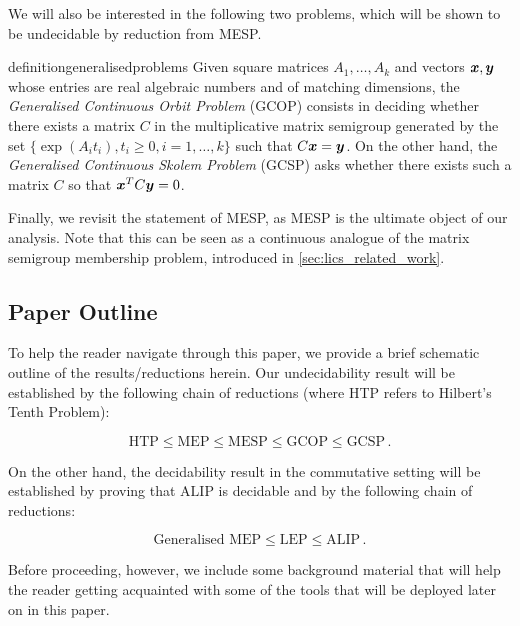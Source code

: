 We will also be interested in the following two problems, which will be shown to be undecidable by reduction from MESP\@.

\begin{restatable}{definition}{generalisedproblems}
\label{def:generalised-problems}
Given square matrices $A_{1}, \ldots, A_{k}$ and vectors $\boldsymbol{x}, \boldsymbol{y}$ whose entries are real algebraic numbers and of matching dimensions, the \emph{Generalised Continuous Orbit Problem} (GCOP) consists in deciding whether there exists a matrix $C$ in the multiplicative matrix semigroup generated by the set $\lbrace \exp(A_{i} t_{i}), t_{i} \geq 0, i = 1, \ldots, k \rbrace$ such that $C\boldsymbol{x} = \boldsymbol{y}$. On the other hand, the \emph{Generalised Continuous Skolem Problem} (GCSP) asks whether there exists such a matrix $C$ so that $\boldsymbol{x}^{T} C \boldsymbol{y} = 0$.
\end{restatable}

Finally, we revisit the statement of MESP, as MESP is the ultimate object of our analysis.
Note that this can be seen as a continuous analogue of the matrix semigroup membership problem, introduced in \cref{sec:lics_related_work}.

\MESP*

\subsection{Paper Outline}
\label{sec:lics_outline}

To help the reader navigate through this paper, we provide a brief schematic outline of the results/reductions herein. Our undecidability result will be established by the following chain of reductions (where HTP refers to Hilbert's Tenth Problem):

\begin{equation*}
\mbox{HTP} \leq \mbox{MEP} \leq \mbox{MESP} \leq \mbox{GCOP} \leq \mbox{GCSP} \, .
\end{equation*}

On the other hand, the decidability result in the commutative setting will be established by proving that $\mbox{ALIP}$ is decidable and by the following chain of reductions:

\begin{equation*}
\mbox{Generalised MEP} \leq \mbox{LEP} \leq \mbox{ALIP} \, .
\end{equation*}

Before proceeding, however, we include some background material that will help the reader getting acquainted with some of the tools that will be deployed later on in this paper.


